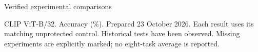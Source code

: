 \documentclass[10pt]{article}
\begin{document}
\begin{center}\Large Verified experimental comparisons\end{center}
\small CLIP ViT-B/32. Accuracy (\%). Prepared 23 October 2026. Each result uses its matching unprotected control. Historical tests have been observed. Missing experiments are explicitly marked; no eight-task average is reported.

\clearpage

\end{document}

